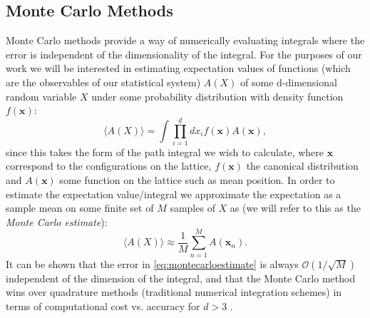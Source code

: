 \documentclass[12pt]{article}
\begin{document}
    \subsection{Monte Carlo Methods}
    Monte Carlo methods provide a way of numerically evaluating integrals where the error is independent of the dimensionality of the integral. For the purposes of our work we will be interested in estimating expectation values of functions (which are the observables of our statistical system) $A\left(X\right)$ of some d-dimensional random variable $X$ under some probability distribution with density function $f\left(\bm{x}\right)$:
    \begin{equation}
        \label{eq:expectation}
        \langle A\left(X\right) \rangle = \int \prod_{i=1}^{d}{dx_i}f\left(\bm{x}\right)A\left(\bm{x}\right),
    \end{equation}
    since this takes the form of the path integral we wish to calculate, where $\bm{x}$ correspond to the configurations on the lattice, $f\left(\bm{x}\right)$ the canonical distribution and $A\left(\bm{x}\right)$ some function on the lattice such as mean position. In order to estimate the expectation value/integral we approximate the expectation as a sample mean on some finite set of $M$ samples of $X$ as (we will refer to this as the \textit{Monte Carlo estimate}):
    \begin{equation}
        \label{eq:montecarloestimate}
        \langle A\left(X\right)\rangle \approx \frac{1}{M} \sum_{n=1}^{M}A\left(\bm{x}_n\right).
    \end{equation}
    It can be shown that the error in \ref{eq:montecarloestimate} is always $\mathcal{O}\left(1/\sqrt{M}\right)$ independent of the dimension of the integral, and that the Monte Carlo method wins over quadrature methods (traditional numerical integration schemes) in terms of computational cost vs. accuracy for $d>3$ \cite{gattringer_lang_2013}.
\end{document}

